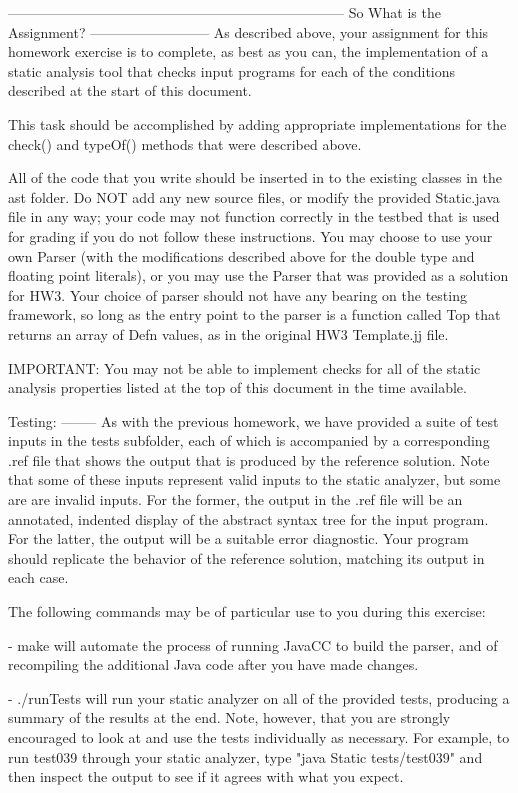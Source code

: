 \documentclass{article}
\begin{document}
------------------------------------------------------------------------
So What is the Assignment?
--------------------------
As described above, your assignment for this homework exercise is
to complete, as best as you can, the implementation of a static
analysis tool that checks input programs for each of the conditions
described at the start of this document.

This task should be accomplished by adding appropriate
implementations for the check() and typeOf() methods that were
described above.

All of the code that you write should be inserted in to the
existing classes in the ast folder.  Do NOT add any new source
files, or modify the provided Static.java file in any way; your
code may not function correctly in the testbed that is used for
grading if you do not follow these instructions.  You may choose to
use your own Parser (with the modifications described above for the
double type and floating point literals), or you may use the Parser
that was provided as a solution for HW3.  Your choice of parser
should not have any bearing on the testing framework, so long as
the entry point to the parser is a function called Top that returns
an array of Defn values, as in the original HW3 Template.jj file.

IMPORTANT: You may not be able to implement checks for all of the
static analysis properties listed at the top of this document in
the time available.

Testing:
--------
As with the previous homework, we have provided a suite of test
inputs in the tests subfolder, each of which is accompanied by a
corresponding .ref file that shows the output that is produced by
the reference solution.  Note that some of these inputs represent
valid inputs to the static analyzer, but some are are invalid
inputs.  For the former, the output in the .ref file will be an
annotated, indented display of the abstract syntax tree for the
input program.  For the latter, the output will be a suitable error
diagnostic.  Your program should replicate the behavior of the
reference solution, matching its output in each case.

The following commands may be of particular use to you during this
exercise:

- make   will automate the process of running JavaCC to build the
  parser, and of recompiling the additional Java code after you have
  made changes.

- ./runTests   will run your static analyzer on all of the provided
  tests, producing a summary of the results at the end.  Note,
  however, that you are strongly encouraged to look at and use the
  tests individually as necessary.  For example, to run test039
  through your static analyzer, type "java Static tests/test039" and
  then inspect the output to see if it agrees with what you expect.
\end{document}
